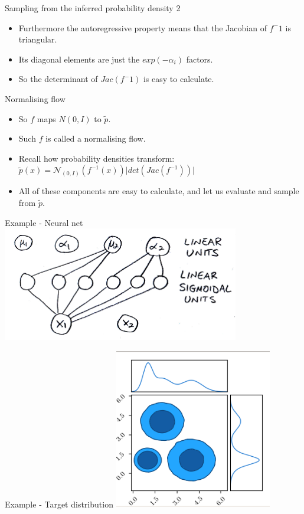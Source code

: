 \documentclass[usenames,dvipsnames]{beamer}
\begin{document}
\begin{frame}{Sampling from the inferred probability density 2}
    \begin{itemize}
      \item{Furthermore the autoregressive property means that the Jacobian of $f^-1$ is triangular.}
	\item{Its diagonal elements are just the $exp(-\alpha_i)$ factors.}
	\item{So the determinant of $Jac(f^-1)$ is easy to calculate.}
    \end{itemize}
\end{frame}

\begin{frame}{Normalising flow}
    \begin{itemize}
      \item{So $f$ maps $N(0, I)$ to $\tilde{p}$.}
	\item{Such $f$ is called a normalising flow.}
	\item{Recall how probability densities transform: \\
	$\tilde{p}(x) = \mathcal{N}_{(0, I)}(f^{-1}(x)) \lvert det(Jac(f^{-1})) \rvert$}
	\item{All of these components are easy to calculate, and let us evaluate and sample from $\tilde{p}$.}
    \end{itemize}
\end{frame}

\begin{frame}{Example - Neural net}
     \centering
     \includegraphics[height=5cm]{image_06}
\end{frame}

\begin{frame}{Example - Target distribution}
     \centering
     \includegraphics[height=7cm]{image_07}
\end{frame}
\end{document}
